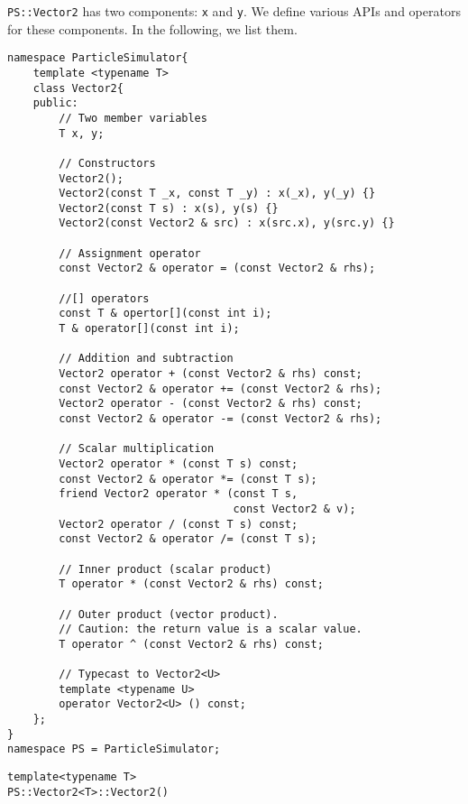 \texttt{PS::Vector2} has two components: \texttt{x} and \texttt{y}.
We define various APIs and operators for these components.
In the following, we list them.

\begin{lstlisting}[caption=Vector2]
namespace ParticleSimulator{
    template <typename T>
    class Vector2{
    public:
        // Two member variables
        T x, y;

        // Constructors
        Vector2();
        Vector2(const T _x, const T _y) : x(_x), y(_y) {}
        Vector2(const T s) : x(s), y(s) {}
        Vector2(const Vector2 & src) : x(src.x), y(src.y) {}

        // Assignment operator
        const Vector2 & operator = (const Vector2 & rhs);

        //[] operators
        const T & opertor[](const int i);
        T & operator[](const int i);

        // Addition and subtraction
        Vector2 operator + (const Vector2 & rhs) const;
        const Vector2 & operator += (const Vector2 & rhs);
        Vector2 operator - (const Vector2 & rhs) const;
        const Vector2 & operator -= (const Vector2 & rhs);

        // Scalar multiplication
        Vector2 operator * (const T s) const;
        const Vector2 & operator *= (const T s);
        friend Vector2 operator * (const T s,
                                   const Vector2 & v);
        Vector2 operator / (const T s) const;
        const Vector2 & operator /= (const T s);

        // Inner product (scalar product)
        T operator * (const Vector2 & rhs) const;

        // Outer product (vector product).
        // Caution: the return value is a scalar value.
        T operator ^ (const Vector2 & rhs) const;

        // Typecast to Vector2<U>
        template <typename U>
        operator Vector2<U> () const;
    };
}
namespace PS = ParticleSimulator;
\end{lstlisting}


\begin{screen}
\begin{verbatim}
template<typename T>
PS::Vector2<T>::Vector2()
\end{verbatim}
\end{screen}


